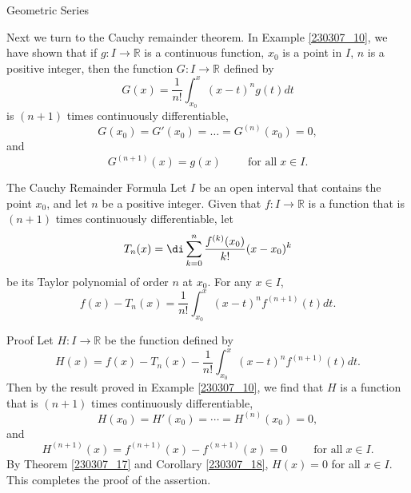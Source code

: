 \begin{example}[label=230305_16]{Geometric Series}
\begin{example}[label=230304_9]{}
\begin{example}{}
\begin{example}{}
Next we turn to the Cauchy remainder theorem. In Example \ref{230307_10}, we have shown that if $g:I\to\mathbb{R}$ is a continuous function, $x_0$ is a point in $I$,  $n$ is a positive integer, then  the function $G:I\to\mathbb{R}$ defined by
\[G(x)=\frac{1}{n!}\int_{x_0}^x(x-t)^ng(t)dt \]
  is $(n+1)$ times continuously differentiable,  
\[G(x_0)=G'(x_0)=\ldots=G^{(n)}(x_0)=0,\]
and
\[G^{(n+1)}(x)=g(x)\hspace{1cm}\text{for all}\;x\in I.\]
\begin{theorem}{The Cauchy Remainder Formula}
Let $I$ be an open interval that contains the point $x_0$, and let $n$ be a positive integer. Given that $f:I\to\mathbb{R}$   is a function that is $(n+1)$ times continuously differentiable, let \[T_n(x)=\di\sum_{k=0}^n\frac{f^{(k)}(x_0)}{k!}(x-x_0)^k\]be its Taylor polynomial of order $n$ at $x_0$. For any $x\in I$,  
\[f(x)-T_n(x)=\frac{1}{n!}\int_{x_0}^x (x-t)^n f^{(n+1)}(t)dt.\]

\end{theorem}
\begin{myproof}{Proof}
Let $H: I\to\mathbb{R}$ be the function defined by
\[H(x)=f(x)-T_n(x)-\frac{1}{n!}\int_{x_0}^x (x-t)^n f^{(n+1)}(t)dt.\]
Then by the result proved in Example \ref{230307_10}, we find that $H$ is a function that is $(n+1)$ times continuously differentiable,
\[H(x_0)=H'(x_0)=\cdots=H^{(n)}(x_0)=0,\]
and
\[H^{(n+1)}(x)=f^{(n+1)}(x)-f^{(n+1)}(x)=0\hspace{1cm}\text{for all}\;x\in I.\]
By Theorem \ref{230307_17} and Corollary \ref{230307_18}, $H(x)=0$ for all $x\in I$. This completes the proof of the assertion.
\end{myproof}


\end{example}
\end{example}
\end{example}
\end{example}

